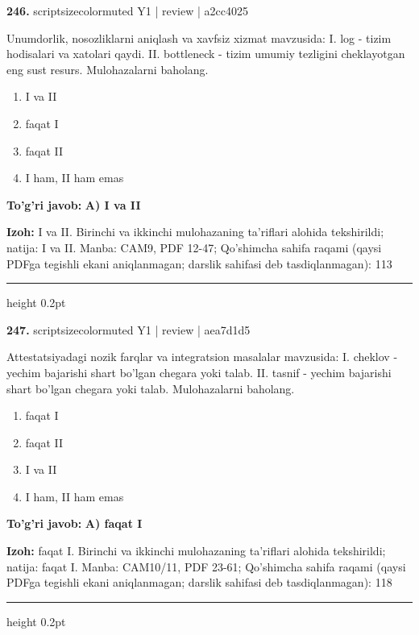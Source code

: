 \documentclass[10pt,a4paper]{article}
\begin{document}
{\bfseries\sffamily\color{ink} 246.} {scriptsizecolor{muted} Y1 | review | a2cc4025}
\par
Unumdorlik, nosozliklarni aniqlash va xavfsiz xizmat mavzusida: I. log - tizim hodisalari va xatolari qaydi. II. bottleneck - tizim umumiy tezligini cheklayotgan eng sust resurs. Mulohazalarni baholang.
\begin{enumerate}[label=\Alph*),leftmargin=9mm]
\item I va II
\item faqat I
\item faqat II
\item I ham, II ham emas
\end{enumerate}
\begin{tcolorbox}[enhanced,breakable,colback=teal!4,colframe=teal!60!black,boxrule=0.45pt,arc=1.2mm,left=2.7mm,right=2.7mm,top=1.8mm,bottom=1.8mm,before skip=2mm,after skip=2mm]
{\bfseries\sffamily\color{teal}To'g'ri javob:} \textbf{A) I va II}
\par\smallskip
{\bfseries Izoh:} I va II. Birinchi va ikkinchi mulohazaning ta'riflari alohida tekshirildi; natija: I va II. Manba: CAM9, PDF 12-47; Qo'shimcha sahifa raqami (qaysi PDFga tegishli ekani aniqlanmagan; darslik sahifasi deb tasdiqlanmagan): 113
\end{tcolorbox}
\vspace{2mm}\hrule height 0.2pt\vspace{3mm}

{\bfseries\sffamily\color{ink} 247.} {scriptsizecolor{muted} Y1 | review | aea7d1d5}
\par
Attestatsiyadagi nozik farqlar va integratsion masalalar mavzusida: I. cheklov - yechim bajarishi shart bo'lgan chegara yoki talab. II. tasnif - yechim bajarishi shart bo'lgan chegara yoki talab. Mulohazalarni baholang.
\begin{enumerate}[label=\Alph*),leftmargin=9mm]
\item faqat I
\item faqat II
\item I va II
\item I ham, II ham emas
\end{enumerate}
\begin{tcolorbox}[enhanced,breakable,colback=teal!4,colframe=teal!60!black,boxrule=0.45pt,arc=1.2mm,left=2.7mm,right=2.7mm,top=1.8mm,bottom=1.8mm,before skip=2mm,after skip=2mm]
{\bfseries\sffamily\color{teal}To'g'ri javob:} \textbf{A) faqat I}
\par\smallskip
{\bfseries Izoh:} faqat I. Birinchi va ikkinchi mulohazaning ta'riflari alohida tekshirildi; natija: faqat I. Manba: CAM10/11, PDF 23-61; Qo'shimcha sahifa raqami (qaysi PDFga tegishli ekani aniqlanmagan; darslik sahifasi deb tasdiqlanmagan): 118
\end{tcolorbox}
\vspace{2mm}\hrule height 0.2pt\vspace{3mm}
\end{document}
